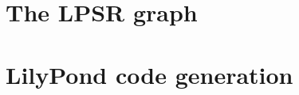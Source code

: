 \documentclass[12pt,a4paper]{article}
\begin{document}
\section{The LPSR graph}


\section{LilyPond code generation}




\pagebreak

\lstlistoflistings

\listoffigures

\tableofcontents


\end{document}
